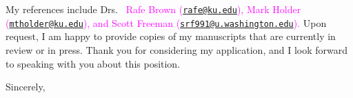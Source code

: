 \documentclass[letterpaper, 10pt]{letter}
\newcommand{\highlight}[1]{\textcolor{magenta}{#1}}
\begin{document}
\begin{letter}
My references include Drs.\
\highlight{
Rafe Brown
(\href{mailto:rafe@ku.edu}{\tt rafe@ku.edu}),
Mark Holder
(\href{mailto:mtholder@ku.edu}{\tt mtholder@ku.edu}),
and
Scott Freeman
(\href{mailto:srf991@u.washington.edu}{\tt srf991@u.washington.edu}).
}
Upon request, I am happy to provide copies of my manuscripts that are currently
in review or in press.
Thank you for considering my application, and I look forward to speaking with
you about this position.

\addtolength{\medskipamount}{-5pt}
\closing{Sincerely,}
\end{letter}
\end{document}
